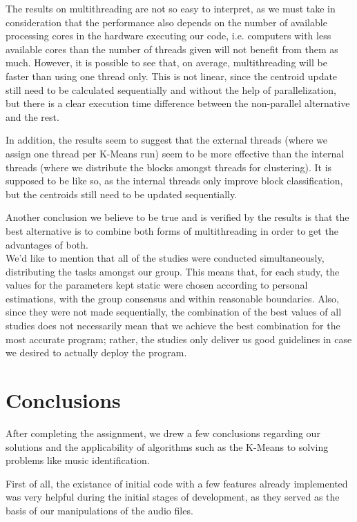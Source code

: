 \documentclass[12pt]{article}
\begin{document}
The results on multithreading are not so easy to interpret, as we must take in 
consideration that the performance also depends on the number of available 
processing cores in the hardware executing our code, i.e. computers with less
available cores than the number of threads given will not benefit from them as much.
However, it is possible to see that, on average, multithreading will be faster
than using one thread only.
This is not linear, since the centroid update still need to be calculated sequentially and without the help of parallelization, but
there is a clear execution time difference between the non-parallel alternative and the rest.

In addition, the results seem to suggest that the external threads (where we 
assign one thread per K-Means run) seem to be more effective than the internal
threads (where we distribute the blocks amongst threads for clustering).
It is supposed to be like so, as the internal threads only improve block 
classification, but the centroids still need to be updated sequentially.

Another conclusion we believe to be true and is verified by the results is that
the best alternative is to combine both forms of multithreading in order to get
the advantages of both. \\

We'd like to mention that all of the studies were conducted simultaneously,
distributing the tasks amongst our group.
This means that, for each study, the values for the parameters kept static were
chosen according to personal estimations, with the group consensus and within
reasonable boundaries.
Also, since they were not made sequentially, the combination of the best values
of all studies does not necessarily mean that we achieve the best combination for
the most accurate program; rather, the studies only deliver us good guidelines
in case we desired to actually deploy the program.

\newpage
\section*{Conclusions}

After completing the assignment, we drew a few conclusions regarding our 
solutions and the applicability of algorithms such as the K-Means to solving
problems like music identification.

First of all, the existance of initial code with a few features already 
implemented was very helpful during the initial stages of development, as they 
served as the basis of our manipulations of the audio files.
\end{document}
